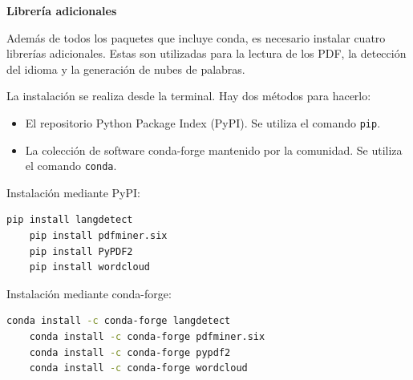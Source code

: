 \documentclass[../main.tex]{subfiles}
\begin{document}
\textbf{Librería adicionales}

Además de todos los paquetes que incluye conda, es necesario instalar cuatro librerías adicionales. Estas son utilizadas para la lectura de los PDF, la detección del idioma y la generación de nubes de palabras.

La instalación se realiza desde la terminal. Hay dos métodos para hacerlo:

\begin{itemize}
	\item El repositorio Python Package Index (PyPI). Se utiliza el comando \texttt{pip}.
	\item La colección de software conda-forge mantenido por la comunidad. Se utiliza el comando \texttt{conda}.
\end{itemize}

Instalación mediante PyPI:

\begin{lstlisting}[language=bash]
	pip install langdetect
	pip install pdfminer.six
	pip install PyPDF2
	pip install wordcloud
\end{lstlisting}

Instalación mediante conda-forge:

\begin{lstlisting}[language=bash]
	conda install -c conda-forge langdetect
	conda install -c conda-forge pdfminer.six
	conda install -c conda-forge pypdf2
	conda install -c conda-forge wordcloud
\end{lstlisting}
\end{document}
